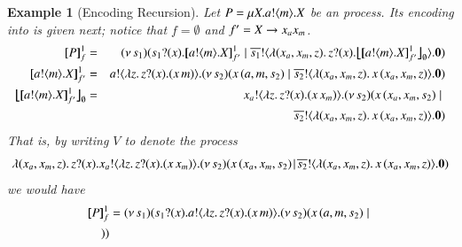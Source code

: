 \documentclass[preprint,11pt]{elsarticle}
\newtheorem{example}{Example}[section]
\begin{document}
{{%
\begin{example}[Encoding Recursion]
Let $P = \mu X. a ! \langle m \rangle . X$ be an \HOp process.
Its encoding into \HO is given next; notice that $f = \emptyset$ and $f' = X \rightarrow x_ax_m$.
\begin{eqnarray*}
	\pmapp{P}{1}{f} &=&
	\newsp{s_1}{ \binp{s_1}{x} \pmapp{\bout{a}{m} \varp{X}}{1}{{f'}} \Par \bout{\dual{s_1}}{ \abs{(x_a, x_m, z)} \binp{z}{x} \auxmapp{\pmapp{\bout{a}{m} \varp{X}}{1}{{f'}}}{{}}{\es} } \inact} \\
\pmapp{\bout{a}{m} \varp{X}}{1}{{ f'}} &=&
	\bout{a}{\abs{z}{\binp{z}{x} (\appl{x}{m})}} \newsp{s_2}{\appl{x}{(a,m, s_2)}  \Par \bout{\dual{s_2}}{\abs{(x_a, x_m, z)}{\appl{x}{(x_a, x_m, z)}}} \inact} \\
	\auxmapp{\pmapp{\bout{a}{m} \varp{X}}{1}{{f'}}}{{}}{\es}
	  & = & 
	\bout{x_a}{\abs{z}{\binp{z}{x} (\appl{x}{x_m})}} \newsp{s_2}{\appl{x}{(x_a,x_m, s_2)}  \Par \\
	& & \qquad \qquad \qquad \qquad \qquad \qquad \qquad \bout{\dual{s_2}}{\abs{(x_a, x_m, z)}{\appl{x}{(x_a, x_m, z)}}} \inact}
\end{eqnarray*}
That is, by writing $V$ to denote the process
$$
\lambda (x_a, x_m, z).\,z ? (x) . x_a ! \langle \lambda z.\,z ? (x) . (x\, {x_m}) \rangle . (\nu\, s_2)(x\, {(x_a,x_m, s_2)}  \!\;|\;\! \overline{s_2} ! \langle \lambda (x_a, x_m, z).\,x\, {(x_a, x_m, z)} \rangle . \mathbf{0})
$$
we would have %
\begin{align*}
[\!\![P]\!\!]^1_f & =  (\nu\, s_1)(s_1 ? (x) .  a ! \langle \lambda z.\,z ? (x) . (x\, {m}) \rangle . (\nu\, s_2)(x\, {(a,m, s_2)}  \;|\; \\
))
\end{align*}
\end{example}}}
\end{document}
